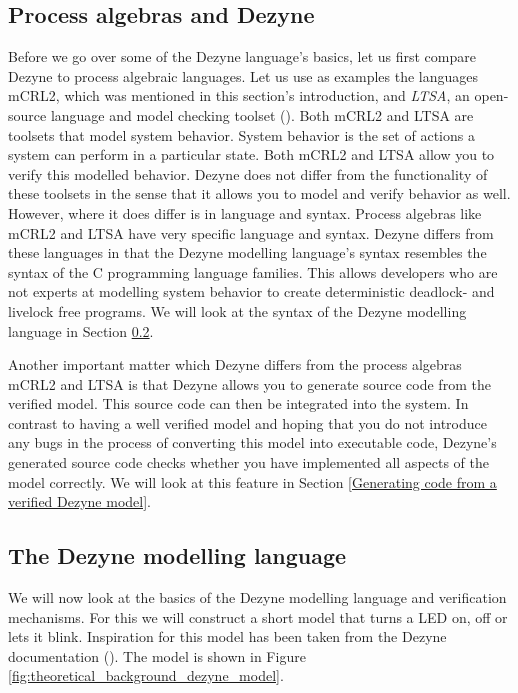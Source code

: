 \documentclass[12pt]{scrreprt}
\begin{document}
\subsection{Process algebras and Dezyne}
Before we go over some of the Dezyne language's basics, let us first compare Dezyne to process algebraic languages. Let us use as examples the languages mCRL2, which was mentioned in this section's introduction, and \textit{LTSA}, an open-source language and model checking toolset (\cite{ltsa}). Both mCRL2 and LTSA are toolsets that model system behavior. System behavior is the set of actions a system can perform in a particular state. Both mCRL2 and LTSA allow you to verify this modelled behavior. Dezyne does not differ from the functionality of these toolsets in the sense that it allows you to model and verify behavior as well. However, where it does differ is in language and syntax. Process algebras like mCRL2 and LTSA have very specific language and syntax. Dezyne differs from these languages in that the Dezyne modelling language's syntax resembles the syntax of the C programming language families. This allows developers who are not experts at modelling system behavior to create deterministic deadlock- and livelock free programs. We will look at the syntax of the Dezyne modelling language in Section \ref{The Dezyne toolset and the Dezyne modelling language}.
\par
Another important matter  which Dezyne differs from the process algebras mCRL2 and LTSA is that Dezyne allows you to generate source code from the verified model. This source code can then be integrated into the system. In contrast to having a well verified model and hoping that you do not introduce any bugs in the process of converting this model into executable code, Dezyne's generated source code checks whether you have implemented all aspects of the model correctly. We will look at this feature in Section \ref{Generating code from a verified Dezyne model}.

\subsection{The Dezyne modelling language}
\label{The Dezyne toolset and the Dezyne modelling language}
We will now look at the basics of the Dezyne modelling language and verification mechanisms. For this we will construct a short model that turns a LED on, off or lets it blink. Inspiration for this model has been taken from the Dezyne documentation (\cite{dzntut}). The model is shown in Figure \ref{fig:theoretical_background_dezyne_model}.
\end{document}
